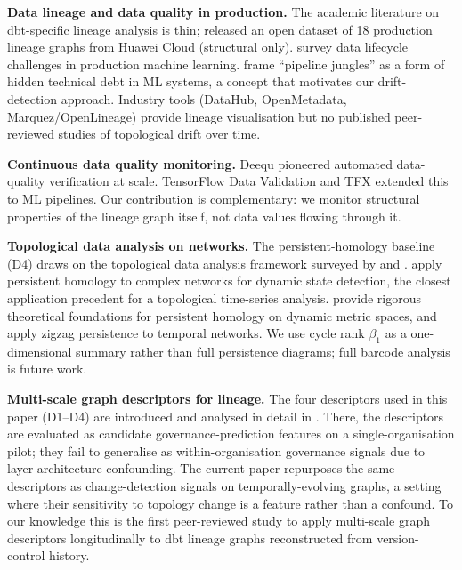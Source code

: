 \documentclass[11pt,a4paper]{article}
\begin{document}
\textbf{Data lineage and data quality in production.}
The academic literature on dbt-specific lineage analysis is thin;
\citet{chen2024dlgdg} released an open dataset of 18 production lineage
graphs from Huawei Cloud (structural only). \citet{polyzotis2018data}
survey data lifecycle challenges in production machine learning.
\citet{sculley2015hidden} frame ``pipeline jungles'' as a form of
hidden technical debt in ML systems, a concept that motivates our
drift-detection approach. Industry tools (DataHub, OpenMetadata,
Marquez/OpenLineage) provide lineage visualisation but no published
peer-reviewed studies of topological drift over time.

\textbf{Continuous data quality monitoring.}
Deequ \citep{schelter2018automating} pioneered automated data-quality
verification at scale. TensorFlow Data Validation
\citep{breck2019data} and TFX \citep{modi2017tfx} extended this to
ML pipelines. Our contribution is complementary: we monitor structural
properties of the lineage graph itself, not data values flowing
through it.

\textbf{Topological data analysis on networks.}
The persistent-homology baseline (D4) draws on the topological data
analysis framework surveyed by \citet{carlsson2009topology} and
\citet{ghrist2008barcodes}. \citet{myers2019persistent} apply
persistent homology to complex networks for dynamic state detection,
the closest application precedent for a topological time-series
analysis. \citet{kim2021spatiotemporal} provide rigorous theoretical
foundations for persistent homology on dynamic metric spaces, and
\citet{myers2023temporal} apply zigzag persistence to temporal
networks. We use cycle rank $\beta_1$ as a one-dimensional summary
rather than full persistence diagrams; full barcode analysis is
future work.

\textbf{Multi-scale graph descriptors for lineage.}
The four descriptors used in this paper (D1--D4) are introduced and
analysed in detail in \citet{hari2026descriptors}. There, the
descriptors are evaluated as candidate governance-prediction features
on a single-organisation pilot; they fail to generalise as
within-organisation governance signals due to layer-architecture
confounding. The current paper repurposes the same descriptors as
change-detection signals on temporally-evolving graphs, a setting
where their sensitivity to topology change is a feature rather than a
confound. To our knowledge this is the first peer-reviewed study to
apply multi-scale graph descriptors longitudinally to dbt lineage
graphs reconstructed from version-control history.
\end{document}
